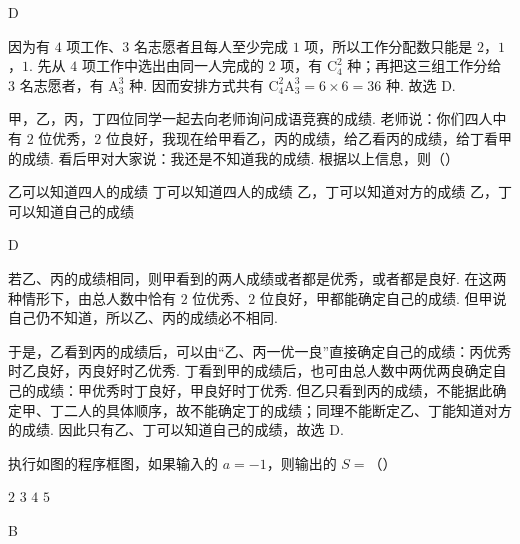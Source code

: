 \begin{answer}
D
\end{answer}

\begin{solution}
因为有 \(4\) 项工作、\(3\) 名志愿者且每人至少完成 \(1\) 项，所以工作分配数只能是 \(2\)，\(1\)，\(1\). 先从 \(4\) 项工作中选出由同一人完成的 \(2\) 项，有 \(\mathrm C_4^2\) 种；再把这三组工作分给 \(3\) 名志愿者，有 \(\mathrm A_3^3\) 种. 因而安排方式共有
\(\mathrm C_4^2\mathrm A_3^3=6\times6=36\)
种. 故选 D.
\end{solution}

\begin{problem}
甲，乙，丙，丁四位同学一起去向老师询问成语竞赛的成绩. 老师说：你们四人中有 \(2\) 位优秀，\(2\) 位良好，我现在给甲看乙，丙的成绩，给乙看丙的成绩，给丁看甲的成绩. 看后甲对大家说：我还是不知道我的成绩. 根据以上信息，则（\quad）

\choices
    {乙可以知道四人的成绩}
    {丁可以知道四人的成绩}
    {乙，丁可以知道对方的成绩}
    {乙，丁可以知道自己的成绩}
\end{problem}

\begin{answer}
D
\end{answer}

\begin{solution}
若乙、丙的成绩相同，则甲看到的两人成绩或者都是优秀，或者都是良好. 在这两种情形下，由总人数中恰有 \(2\) 位优秀、\(2\) 位良好，甲都能确定自己的成绩. 但甲说自己仍不知道，所以乙、丙的成绩必不相同.

于是，乙看到丙的成绩后，可以由“乙、丙一优一良”直接确定自己的成绩：丙优秀时乙良好，丙良好时乙优秀. 丁看到甲的成绩后，也可由总人数中两优两良确定自己的成绩：甲优秀时丁良好，甲良好时丁优秀. 但乙只看到丙的成绩，不能据此确定甲、丁二人的具体顺序，故不能确定丁的成绩；同理不能断定乙、丁能知道对方的成绩. 因此只有乙、丁可以知道自己的成绩，故选 D.
\end{solution}

\begin{problem}
执行如图的程序框图，如果输入的 \(a=-1\)，则输出的 \(S=\)（\quad）


\choices
    {\(2\)}
    {\(3\)}
    {\(4\)}
    {\(5\)}
\end{problem}

\begin{answer}
B
\end{answer}

